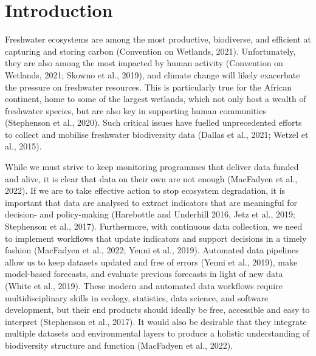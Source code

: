 \documentclass[utf8]{frontiersSCNS}
\begin{document}
\hypertarget{introduction}{%
\section*{Introduction}\label{introduction}}

Freshwater ecosystems are among the most productive, biodiverse, and
efficient at capturing and storing carbon (Convention on Wetlands,
2021). Unfortunately, they are also among the most impacted by human
activity (Convention on Wetlands, 2021; Skowno et al., 2019), and
climate change will likely exacerbate the pressure on freshwater
resources. This is particularly true for the African continent, home to
some of the largest wetlands, which not only host a wealth of freshwater
species, but are also key in supporting human communities (Stephenson et
al., 2020). Such critical issues have fuelled unprecedented efforts to
collect and mobilise freshwater biodiversity data (Dallas et al., 2021;
Wetzel et al., 2015).

While we must strive to keep monitoring programmes that deliver data
funded and alive, it is clear that data on their own are not enough
(MacFadyen et al., 2022). If we are to take effective action to stop
ecosystem degradation, it is important that data are analysed to extract
indicators that are meaningful for decision- and policy-making
(Harebottle and Underhill 2016, Jetz et al., 2019; Stephenson et al.,
2017). Furthermore, with continuous data collection, we need to
implement workflows that update indicators and support decisions in a
timely fashion (MacFadyen et al., 2022; Yenni et al., 2019). Automated
data pipelines allow us to keep datasets updated and free of errors
(Yenni et al., 2019), make model-based forecasts, and evaluate previous
forecasts in light of new data (White et al., 2019). These modern and
automated data workflows require multidisciplinary skills in ecology,
statistics, data science, and software development, but their end
products should ideally be free, accessible and easy to interpret
(Stephenson et al., 2017). It would also be desirable that they
integrate multiple datasets and environmental layers to produce a
holistic understanding of biodiversity structure and function (MacFadyen
et al., 2022).
\end{document}
